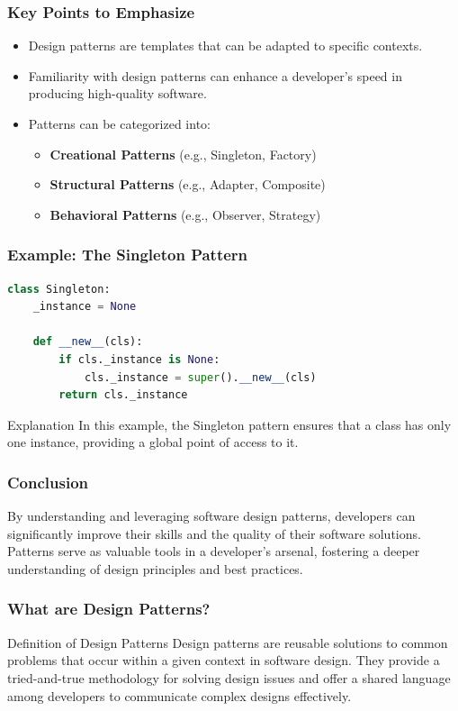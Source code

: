 \documentclass{beamer}
\begin{document}
\begin{frame}[fragile]
    \frametitle{Key Points to Emphasize}
    \begin{itemize}
        \item Design patterns are templates that can be adapted to specific contexts.
        \item Familiarity with design patterns can enhance a developer’s speed in producing high-quality software.
        \item Patterns can be categorized into:
        \begin{itemize}
            \item \textbf{Creational Patterns} (e.g., Singleton, Factory)
            \item \textbf{Structural Patterns} (e.g., Adapter, Composite)
            \item \textbf{Behavioral Patterns} (e.g., Observer, Strategy)
        \end{itemize}
    \end{itemize}
\end{frame}

\begin{frame}[fragile]
    \frametitle{Example: The Singleton Pattern}
    \begin{lstlisting}[language=Python]
class Singleton:
    _instance = None

    def __new__(cls):
        if cls._instance is None:
            cls._instance = super().__new__(cls)
        return cls._instance
    \end{lstlisting}
    \begin{block}{Explanation}
        In this example, the Singleton pattern ensures that a class has only one instance, providing a global point of access to it.
    \end{block}
\end{frame}

\begin{frame}[fragile]
    \frametitle{Conclusion}
    By understanding and leveraging software design patterns, developers can significantly improve their skills and the quality of their software solutions. Patterns serve as valuable tools in a developer’s arsenal, fostering a deeper understanding of design principles and best practices.
\end{frame}

\begin{frame}[fragile]
    \frametitle{What are Design Patterns?}
    \begin{block}{Definition of Design Patterns}
        Design patterns are reusable solutions to common problems that occur within a given context in software design. They provide a tried-and-true methodology for solving design issues and offer a shared language among developers to communicate complex designs effectively.
    \end{block}
\end{frame}
\end{document}
